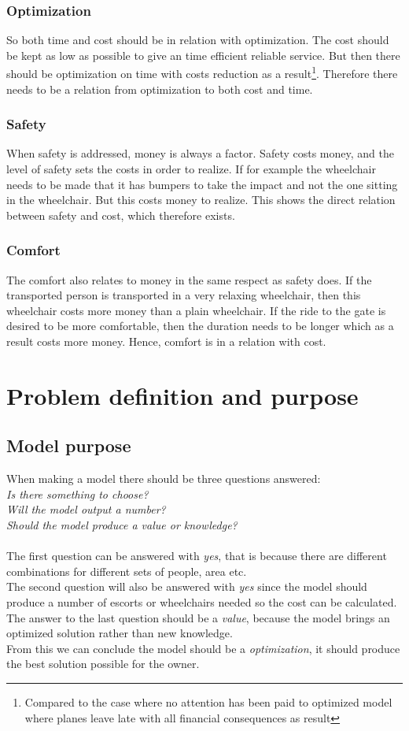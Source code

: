 \documentclass[a4paper, 11pt, notitlepage]{report}
\begin{document}
\subsection{Optimization}
So both time and cost should be in relation with optimization. The cost should be kept as low as possible to give an time efficient reliable service. But then there should be optimization on time with costs reduction as a result\footnote{Compared to the case where no attention has been paid to optimized model where planes leave late with all financial consequences as result}. Therefore there needs to be a relation from optimization to both cost and time.
\subsection{Safety}
When safety is addressed, money is always a factor. Safety costs money, and the level of safety sets the costs in order to realize. If for example the wheelchair needs to be made that it has bumpers to take the impact and not the one sitting in the wheelchair. But this costs money to realize. This shows the direct relation between safety and cost, which therefore exists.
\subsection{Comfort}
The comfort also relates to money in the same respect as safety does. If the transported person is transported in a very relaxing wheelchair, then this wheelchair costs more money than a plain wheelchair. If the ride to the gate is desired to be more comfortable, then the duration needs to be longer which as a result costs more money. Hence, comfort is in a relation with cost.
\chapter{Problem definition and purpose}
\section{Model purpose}
When making a model there should be three questions answered:\\
\emph{Is there something to choose?\\
Will the model output a number?\\
Should the model produce a value or knowledge?}\\\\
The first question can be answered with \emph{yes}, that is because there are different combinations for different sets of people, area etc.\\
The second question will also be answered with \emph{yes} since the model should produce a number of escorts or wheelchairs needed so the cost can be calculated.\\
The answer to the last question should be a \emph{value}, because the model brings an optimized solution rather than new knowledge.\\ From this we can conclude the model should be a \emph{optimization}, it should produce the best solution possible for the owner.
\end{document}
